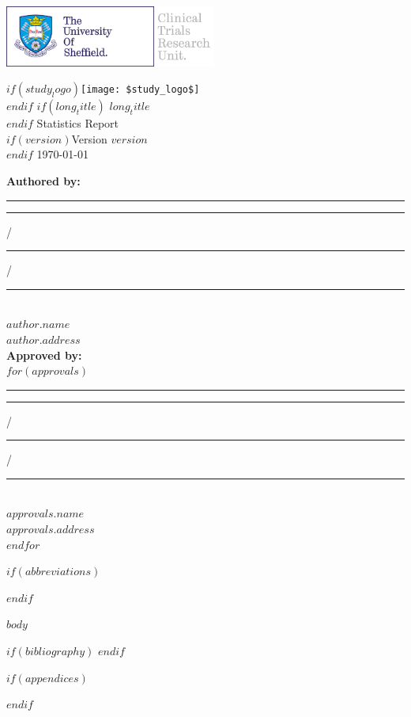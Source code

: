 \documentclass[11pt,a4paper,british]{article}
\begin{document}
\thispagestyle{empty}

\includegraphics[height=2cm]{Images/TUOSLogo}\includegraphics[height=2cm]{Images/CTRULogo}
\begin{center}
$if(study_logo) $\texttt{[image: \$study\_logo\$]}\\ $endif$
$if(long_title)$ $long_title$\\[5mm] $endif$
{\Huge Statistics Report}\\
$if(version)${\Large Version $version$}\\$endif$
{\Large \today}
\end{center}

\begin{singlespace}
\textbf{Authored by:}\\[1cm]
\rule{5cm}{1pt}\hspace{5cm}\rule{1cm}{1pt} /\rule{1cm}{1pt} /\rule{2cm}{1pt}\\
\textit{$author.name$\\
$author.address$}\\[3mm]
\textbf{Approved by:}\\[1cm]
$for(approvals)$
\rule{5cm}{1pt}\hspace{5cm}\rule{1cm}{1pt} /\rule{1cm}{1pt} /\rule{2cm}{1pt}\\
\textit{$approvals.name$\\
$approvals.address$}\\[1cm]
$endfor$
\end{singlespace}

\clearpage
{}
\tableofcontents
\listoftables
\listoffigures

$if(abbreviations)$

$endif$

\clearpage
{}

$body$

$if(bibliography)$
\printbibliography
$endif$

$if(appendices)$
\begin{appendices}



\end{appendices}
$endif$
\end{document}
